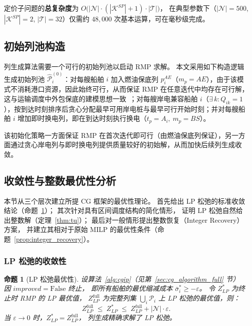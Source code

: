 \documentclass[UTF8, a4paper, 12pt]{ctexart}
\newtheorem{proposition}{命题}
\begin{document}
\noindent
定价子问题的\textbf{总复杂度}为
$O\!\big(|\mathcal{N}| \cdot (|\mathcal{K}^{SP}| + 1) \cdot |\mathcal{T}|\big)$，
在典型参数下（$|\mathcal{N}| = 500$, $|\mathcal{K}^{SP}| = 2$,
$|\mathcal{T}| = 32$）仅需约 $48{,}000$ 次基本运算，可在毫秒级完成。

\subsection{初始列池构造}
\label{sec:cg_init}

列生成算法需要一个可行的初始列池以启动 RMP 求解。
本文采用如下构造逻辑生成初始列池 $\hat{\mathcal{P}}_i^{(0)}$：对每艘船舶 $i$ 加入燃油保底列 $p_i^{AE}$（$m_p = AE$），由于该模式不消耗港口资源，因此始终可行，从而保证 RMP 在任意迭代中均存在可行解，这与运输调度中外包保底的建模思想一致~\cite{Cordeau2015}；对每艘岸电兼容船舶 $i$（$\exists\, k: Q_{ik} = 1$），按到达时刻排序后贪心分配最早可用岸电桩与最早可行开始时刻；并对每艘船舶 $i$ 增加即时换电列，即在到达时刻执行换电（$t_p = A_i,\ m_p = BS$）。

\noindent
该初始化策略一方面保证 RMP 在首次迭代即可行（由燃油保底列保证），另一方面通过贪心岸电列与即时换电列提供质量较好的初始解，从而加快后续列生成收敛。

\subsection{收敛性与整数最优性分析}
\label{sec:cg_convergence}

本节从三个层次建立所提 CG 框架的最优性理论。
首先给出 LP 松弛的标准收敛结论（命题~\ref{prop:lp}）；
其次针对具有区间调度结构的简化情形，
证明 LP 松弛自然给出整数解（定理~\ref{thm:tu}）；
最后对一般情形提出整数恢复（Integer Recovery）方案，
并建立其相对于原始 MILP 的最优性条件（命题~\ref{prop:integer_recovery}）。

\subsubsection{LP 松弛的收敛性}

\begin{proposition}[LP 松弛最优性]
\label{prop:lp}
设算法~\ref{alg:cgip}（见第~\ref{sec:cg_algorithm_full} 节）
因 $\textit{improved} = \mathrm{False}$ 终止，
即所有船舶的最优缩减成本 $\bar{\sigma}_i^* \ge -\varepsilon$。
令 $Z_{LP}^*$ 为终止时 RMP 的 LP 最优值，
$Z_{LP}^{\text{full}}$ 为完整列集 $\bigcup_i \mathcal{P}_i$ 上 LP 松弛的最优值，则：
\begin{equation}
  Z_{LP}^{\text{full}} \;\le\; Z_{LP}^* \;\le\; Z_{LP}^{\text{full}} + |\mathcal{N}|\cdot\varepsilon.
  \label{eq:lp_bound}
\end{equation}
当 $\varepsilon\to 0$ 时，$Z_{LP}^* = Z_{LP}^{\text{full}}$，
列生成精确求解了 LP 松弛。
\end{proposition}
\end{document}
